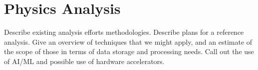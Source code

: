 \section{Physics Analysis}
\label{sec:analysis}
Describe existing analysis efforts methodologies.  Describe plans for a reference analysis.  Give an overview of techniques that we might apply, and an estimate of the scope of those in terms of data storage and processing needs.  Call out the use of AI/ML and possible use of hardware accelerators.
